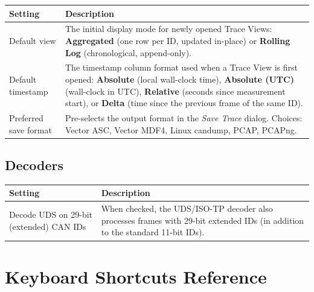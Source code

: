 \documentclass[a4paper,11pt]{article}
\newcommand{\menu}[1]{\textit{#1}}
\newcommand{\ui}[1]{\textbf{#1}}
\begin{document}
\begin{table}[h]
  \centering
  \begin{tabularx}{\textwidth}{lX}
    \toprule
    \textbf{Setting} & \textbf{Description} \\
    \midrule
    Default view
      & The initial display mode for newly opened Trace Views:
        \ui{Aggregated} (one row per ID, updated in-place) or
        \ui{Rolling Log} (chronological, append-only). \\
    Default timestamp
      & The timestamp column format used when a Trace View is first opened:
        \ui{Absolute} (local wall-clock time),
        \ui{Absolute (UTC)} (wall-clock in UTC),
        \ui{Relative} (seconds since measurement start), or
        \ui{Delta} (time since the previous frame of the same ID). \\
    Preferred save format
      & Pre-selects the output format in the \menu{Save Trace} dialog.
        Choices: Vector ASC, Vector MDF4, Linux candump, PCAP, PCAPng. \\
    \bottomrule
  \end{tabularx}
\end{table}

\subsection*{Decoders}

\begin{table}[h]
  \centering
  \begin{tabularx}{\textwidth}{lX}
    \toprule
    \textbf{Setting} & \textbf{Description} \\
    \midrule
    Decode UDS on 29-bit (extended) CAN IDs
      & When checked, the UDS/ISO-TP decoder also processes frames with
        29-bit extended IDs (in addition to the standard 11-bit IDs). \\
    \bottomrule
  \end{tabularx}
\end{table}

\section{Keyboard Shortcuts Reference}
\end{document}
